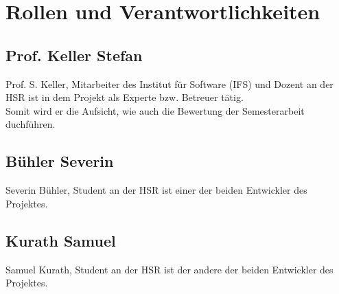 \section{Rollen und Verantwortlichkeiten}
\subsection{Prof. Keller Stefan}
Prof. S. Keller, Mitarbeiter des Institut für Software (IFS) und Dozent an
der HSR ist in dem Projekt als Experte bzw. Betreuer tätig. \\
Somit wird er die Aufsicht, wie auch die Bewertung der Semesterarbeit duchführen.

\subsection{Bühler Severin}
Severin Bühler, Student an der HSR ist einer der beiden Entwickler des Projektes.

\subsection{Kurath Samuel}
Samuel Kurath, Student an der HSR ist der andere der beiden Entwickler des Projektes.
